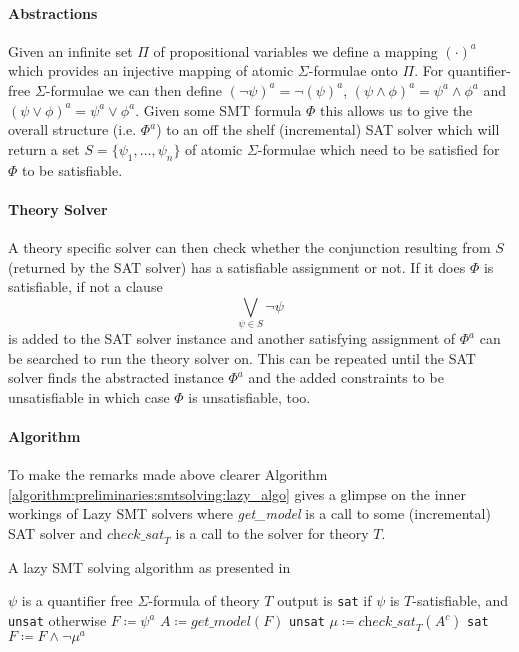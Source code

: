 \paragraph{Abstractions}
Given an infinite set $\Pi$ of propositional variables we define a mapping $(\cdot)^a$ which provides an injective mapping of atomic $\Sigma$-formulae onto $\Pi$. For quantifier-free $\Sigma$-formulae we can then define $\left(\neg\psi\right)^a=\neg\left(\psi\right)^a$, $\left(\psi\land\phi\right)^a=\psi^a\land\phi^a$ and $\left(\psi\lor\phi\right)^a=\psi^a\lor\phi^a$. Given some SMT formula $\Phi$ this allows us to give the overall structure (i.e. $\Phi^a$) to an off the shelf (incremental) SAT solver which will return a set $S=\{\psi_1,\dots,\psi_n\}$ of atomic $\Sigma$-formulae which need to be satisfied for $\Phi$ to be satisfiable.

\paragraph{Theory Solver}
A theory specific solver can then check whether the conjunction resulting from $S$ (returned by the SAT solver) has a satisfiable assignment or not. If it does $\Phi$ is satisfiable, if not a clause \[\bigvee\limits_{\psi\in S} \neg\psi\] is added to the SAT solver instance and another satisfying assignment of $\Phi^a$ can be searched to run the theory solver on. This can be repeated until the SAT solver finds the abstracted instance $\Phi^a$ and the added constraints to be unsatisfiable in which case $\Phi$ is unsatisfiable, too.

\paragraph{Algorithm}
To make the remarks made above clearer Algorithm \ref{algorithm:preliminaries:smtsolving:lazy_algo} gives a glimpse on the inner workings of Lazy SMT solvers where \textit{get\_model} is a call to some (incremental) SAT solver and $\textit{check\_sat}_T$ is a call to the solver for theory $T$.

\begin{algorithm}
    \caption{A lazy SMT solving algorithm as presented in \cite{Barrett-Tinelli-SMT}}
    \begin{algorithmic}
    \label{algorithm:preliminaries:smtsolving:lazy_algo}
    \REQUIRE $\psi$ is a quantifier free $\Sigma$-formula of theory $T$
    \ENSURE output is \texttt{sat} if $\psi$ is $T$-satisfiable, and \texttt{unsat} otherwise
    \STATE $F \coloneqq \psi^a$
    \LOOP
        \STATE $A \coloneqq \textit{get\_model}\left(F\right)$
            \RETURN \texttt{unsat}
        \ELSE
            \STATE $\mu \coloneqq \textit{check\_sat}_T\left(A^c\right)$
                \RETURN \texttt{sat}
            \ELSE
                \STATE $F \coloneqq F \land \neg \mu^a$
            \ENDIF
        \ENDIF
    \ENDLOOP
    \end{algorithmic}
\end{algorithm}